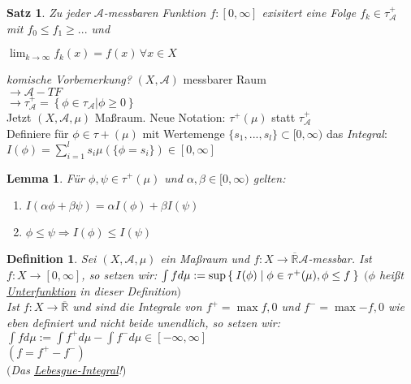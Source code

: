 \documentclass[11pt]{memoir}
\theoremstyle{changebreak}
\newtheorem{Definition}{Definition}[chapter]
\newtheorem{Lemma}{Lemma}[chapter]
\newtheorem{Satz}{Satz}[chapter]
\begin{document}
\begin{Satz}
Zu jeder $\mathscr A$-messbaren Funktion $f: [0, \infty]$ exisitert eine Folge $f_k \in \tau_\mathscr A^+$ mit $f_0 \leq f_1 \geq ...$ und
\begin{center}
	$\lim_{k \rightarrow \infty} f_k(x) = f(x) \, \forall x\in X$
\end{center}
\end{Satz}





\emph{komische Vorbemerkung?}
$(X, \mathscr A)$ messbarer Raum \\
$\rightarrow \mathscr A-TF$ \\
$\rightarrow \tau_\mathscr A ^+ = \left\{\phi \in \tau_\mathscr A | \phi \geq 0\right\}$ \\
Jetzt $(X, \mathscr A, \mu)$ Maßraum. Neue Notation: \underline{$\tau^+ (\mu)$} statt $\tau_\mathscr A ^+$ \\
Definiere für $\phi \in \tau+(\mu)$ mit Wertemenge $\{s_1, ... , s_l\} \subset [0, \infty)$ das \emph{Integral}: \\
$I(\phi) = \sum\limits_{i=1}^l s_i \mu(\{\phi = s_i\}) \in [0, \infty]$


\begin{Lemma}
Für $\phi, \psi \in \tau	^+(\mu)$ und $\alpha, \beta \in [0, \infty)$ gelten:
\begin{enumerate}
	\item $I(\alpha\phi + \beta\psi) = \alpha I(\phi) + \beta I(\psi)$
	\item $\phi \leq \psi \Rightarrow I(\phi) \leq I(\psi)$
\end{enumerate}
\end{Lemma}


\begin{Definition}
Sei $(X, \mathscr A, \mu)$ ein Maßraum und $f: X \rightarrow \overline{\mathbb R} \mathscr A$-messbar. Ist $f: X \rightarrow [0, \infty]$, so setzen wir:
$\int f d\mu := \sup\Set{I(\phi) | \phi \in \tau^+(\mu), \phi \leq f}$ $(\phi$ heißt \underline{Unterfunktion} in dieser Definition$)$ \\

Ist $f: X \rightarrow \overline{\mathbb R}$ und sind die Integrale von $f^+ = \max{f, 0}$ und $f^- = \max{-f, 0}$ wie eben definiert und nicht beide unendlich, so setzen wir: \\
$\int f d\mu := \int f^+ d\mu - \int f^- d\mu \in [-\infty, \infty]$ \\
$(f = f^+ - f^-)$ \\
$($Das \underline{Lebesgue-Integral}!$)$
\end{Definition}
\end{document}
